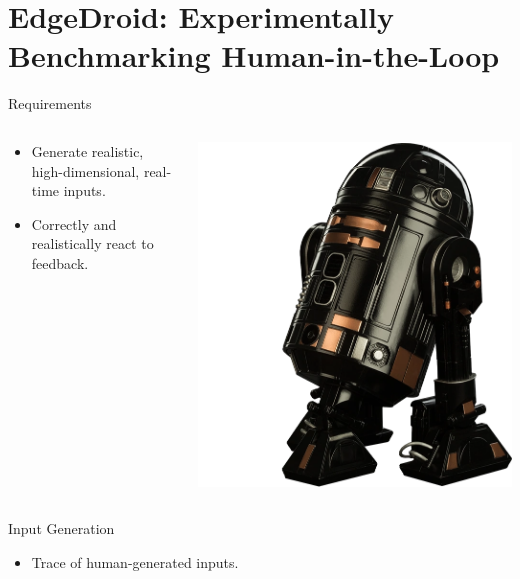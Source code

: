 \documentclass[aspectratio=1610]{beamer}
\begin{document}
\section{EdgeDroid: Experimentally Benchmarking Human-in-the-Loop}
\begin{ssframe}{Requirements}
    \begin{columns}[onlytextwidth]
        \begin{column}{.5\linewidth}
            \begin{itemize}
                \itemsep2em
                \item Generate realistic, high-dimensional, real-time inputs.
                \item Correctly and realistically react to feedback.
            \end{itemize}
        \end{column}%
        \begin{column}{.5\linewidth}
            \centering%
            \includegraphics[width=.7\linewidth]{img/astromech.png}
        \end{column}
    \end{columns}
\end{ssframe}

\begin{frame}{Input Generation}
    \begin{itemize}
        \item Trace of human-generated inputs.
    \end{itemize}
    \begin{center}
        \\
    \end{center}
\end{frame}
\end{document}
